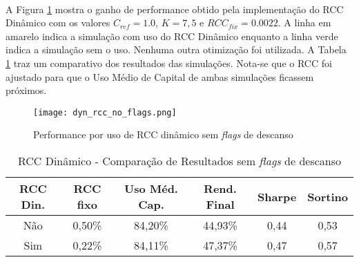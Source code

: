 
\paragraph{} A Figura \ref{fig:150} mostra o ganho de performance obtido pela implementação do RCC Dinâmico com os valores \begin{math} C_{ref} = 1.0 \end{math}, \begin{math} K = 7,5 \end{math} e \begin{math} RCC_{fix} = 0.0022 \end{math}. A linha em amarelo indica a simulação com uso do RCC Dinâmico enquanto a linha verde indica a simulação sem o uso. Nenhuma outra otimização foi utilizada. A Tabela \ref{tab:10} traz um comparativo dos resultados das simulações. Nota-se que o RCC foi ajustado para que o Uso Médio de Capital de ambas simulações ficassem próximos.

\begin{figure}[!htb]
    \texttt{[image: dyn\_rcc\_no\_flags.png]}
    \centering
    \caption{Performance por uso de RCC dinâmico sem \textit{flags} de descanso}
    \label{fig:150}
\end{figure}

\begin{table}[h!]
    \begin{center}
        \begin{tabular}{ c|cc|ccc }
            RCC Din. & RCC fixo & Uso Méd. Cap. & Rend. Final & Sharpe & Sortino \\
            \hline
            Não & 0,50\% & 84,20\% & 44,93\% & 0,44 & 0,53 \\
            Sim & 0,22\% & 84,11\% & 47,37\% & 0,47 & 0,57 \\
        \end{tabular}
        \caption{RCC Dinâmico - Comparação de Resultados sem \textit{flags} de descanso}
        \label{tab:10}
    \end{center}
\end{table}

